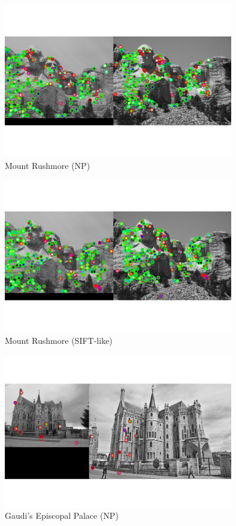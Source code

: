 \begin{figure}[h]
    \centering
    \includegraphics[width=10cm]{writeup/eval_MR bad.png}
    \caption{Mount Rushmore (NP)}
    \label{fig:result2}
\end{figure}
\begin{figure}[h]
    \centering
    \includegraphics[width=10cm]{writeup/eval_MR.png}
    \caption{Mount Rushmore (SIFT-like)}
    \label{fig:result5}
\end{figure}

\begin{figure}[h]
    \centering
    \includegraphics[width=10cm]{writeup/eval_EG bad.png}
    \caption{Gaudi's Episcopal Palace (NP)}
    \label{fig:result3}
\end{figure}

